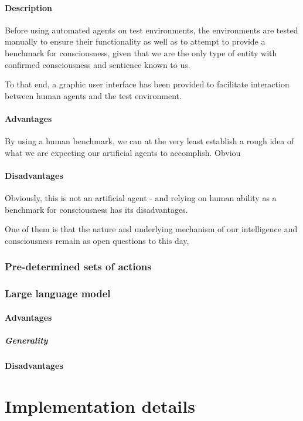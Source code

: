 \documentclass[masterthesis]{fer}
\begin{document}
\paragraph{Description}
Before using automated agents on test environments, the environments are tested manually to ensure their functionality as well as to attempt to provide a benchmark for consciousness, given that we are the only type of entity with confirmed consciousness and sentience known to us.

To that end, a graphic user interface has been provided to facilitate interaction between human agents and the test environment.
\paragraph{Advantages}
By using a human benchmark, we can at the very least establish a rough idea of what we are expecting our artificial agents to accomplish. Obviou
\paragraph{Disadvantages}
Obviously, this is not an artificial agent - and relying on human ability as a benchmark for consciousness has its disadvantages.

One of them is that the nature and underlying mechanism of our intelligence and consciousness remain as open questions to this day,
\subsubsection{Pre-determined sets of actions}

\subsubsection{Large language model}
\paragraph{Advantages}
\subparagraph{Generality}
\paragraph{Disadvantages}

\section{Implementation details}

\end{document}
